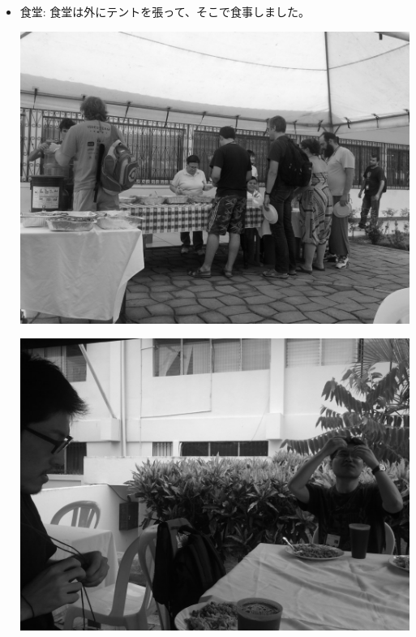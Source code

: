 \documentclass[mingoth,a4paper]{jsarticle}
\begin{document}
\begin{itemize}
 \item 食堂: 食堂は外にテントを張って、そこで食事しました。\\
	\begin{minipage}{0.4\hsize}
	\includegraphics[width=0.8\hsize]{image201208/debconf12_diningroom01_mono.jpg}
	\end{minipage}
	\begin{minipage}{0.4\hsize}
	\includegraphics[width=0.8\hsize]{image201208/debconf12_diningroom02_mono.jpg}
	\end{minipage}



\end{itemize}
\end{document}

